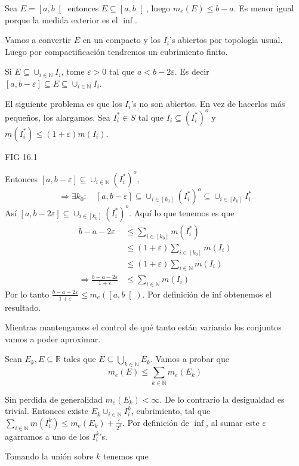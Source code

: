 \documentclass[12pt]{article}
\theoremstyle{plain}
\theoremstyle{definition}
\theoremstyle{remark}
\numberwithin{equation}{section}
\newcommand{\bN}{\mathbb{N}}        %
\newcommand{\bR}{\mathbb{R}}        %
\renewcommand{\leq}{\leqslant}      %
\renewcommand{\:}{\colon}           %
\newcommand{\bonj}[1]{\left\lbrack#1\right\rbrack}
\newcommand{\lbonj}[1]{\left\lbrack#1\right\lbrack}
\begin{document}
\begin{multicols}{2}
\begin{ptcbp}
Sea $E=\lbonj{a,b}$ entonces $E\subseteq\lbonj{a,b}$, luego $m_e(E)\leq b-a$. Es menor igual porque la medida exterior es el $\inf$.\par
Vamos a convertir $E$ en un compacto y los $I_i$'s abiertos por topología usual. Luego por compactificación tendremos un cubrimiento finito.\par
Si $E\subseteq\cup_{i\in\bN}I_i$, tome $\varepsilon>0$ tal que $a<b-2\varepsilon$. Es decir $\bonj{a,b-\varepsilon}\subseteq E\subseteq\cup_{i\in\bN}I_i$.\par
El siguiente problema es que los $I_i$'s no son abiertos. En vez de hacerlos más pequeños, los alargamos. Sea $I_i^*\in S$ tal que $I_i\subseteq(I_i^*)^o$ y $m(I_i^*)\leq (1+\varepsilon)m(I_i)$. \par
FIG 16.1\par
Entonces $\bonj{a,b-\varepsilon}\subseteq\cup_{i\in\bN}(I_i^*)^o$,
$$\Rightarrow\exists k_0\:\quad\bonj{a,b-\varepsilon}\subseteq\cup_{i\in\bonj{k_0}}(I_i^*)^o\subseteq\cup_{i\in\bonj{k_0}}I_i^*$$
Así $\bonj{a,b-2\varepsilon}\subseteq\cup_{i\in\bonj{k_0}}(I_i^*)^o$. Aquí lo que tenemos es que
\begin{align*}
 b-a-2\varepsilon&\leq \sum_{i\in\bonj{k_0}}m(I_i^*)\\
 &\leq (1+\varepsilon) \sum_{i\in\bonj{k_0}}m(I_i)\\
 &\leq (1+\varepsilon) \sum_{i\in\bN}m(I_i)\\
 \Rightarrow\frac{b-a-2\varepsilon}{1+\varepsilon} &\leq \sum_{i\in\bN}m(I_i)
\end{align*}
Por lo tanto $\frac{b-a-2\varepsilon}{1+\varepsilon} \leq m_e(\lbonj{a,b})$. Por definición de inf obtenemos el resultado.
\end{ptcbp}
Mientras mantengamos el control de qué tanto están variando los conjuntos vamos a poder aproximar.\par
Sean $E_k,E\subseteq\bR$ tales que $E\subseteq\bigcup_{k\in\bN} E_k$. Vamos a probar que
$$m_e(E)\leq\sum_{k\in\bN}m_e(E_k)$$
\begin{ptcbp}
Sin perdida de generalidad $m_e(E_k)<\infty$. De lo contrario la desigualdad es trivial. Entonces existe $E_k\cup_{i\in\bN}I_i^k$, cubrimiento, tal que $\sum_{i\in\bN}m(I_i^k)\leq m_e(E_k)+\frac{\varepsilon}{2^k}$. Por definición de $\inf$, al sumar este $\varepsilon$ agarramos a uno de los $I_i^k$'s.\par
Tomando la unión sobre $k$ tenemos que

\end{ptcbp}
\end{multicols}
\end{document}
